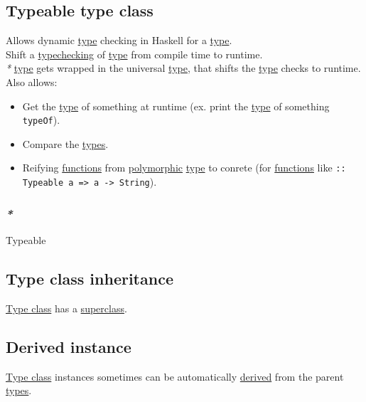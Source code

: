 \documentclass[a4paper,14pt,oneside]{book}
\begin{document}
\subsection{\label{orgd65037b}Typeable type class}
\label{sec:org53bb721}
Allows dynamic \hyperref[org38dea24]{type} checking in Haskell for a \hyperref[org38dea24]{type}.\\
Shift a \hyperref[org82a5060]{typechecking} of \hyperref[org38dea24]{type} from compile time to runtime.\\
\emph{*} \hyperref[org38dea24]{type} gets wrapped in the universal \hyperref[org38dea24]{type}, that shifts the \hyperref[org38dea24]{type} checks to runtime.\\

Also allows:\\
\begin{itemize}
\item Get the \hyperref[org38dea24]{type} of something at runtime (ex. print the \hyperref[org38dea24]{type} of something \texttt{typeOf}).\\
\item Compare the \hyperref[orgb6d8f90]{types}.\\
\item Reifying \hyperref[org69a4fa1]{functions} from \hyperref[org802535f]{polymorphic} \hyperref[org38dea24]{type} to conrete (for \hyperref[org69a4fa1]{functions} like \texttt{:: Typeable a => a -> String}).\\
\end{itemize}

\subsubsection{\emph{*}}
\label{sec:orgca34c87}

\label{org57f8821}Typeable\\

\subsection{\label{org2cc858e}Type class inheritance}
\label{sec:org8626700}
\hyperref[orgd08ec75]{Type class} has a \hyperref[orgb03981a]{superclass}.\\

\subsection{\label{orgc08681d}Derived instance}
\label{sec:org8911576}
\hyperref[orgd08ec75]{Type class} instances sometimes can be automatically \hyperref[org364c577]{derived} from the parent \hyperref[orgb6d8f90]{types}.\\
\end{document}
